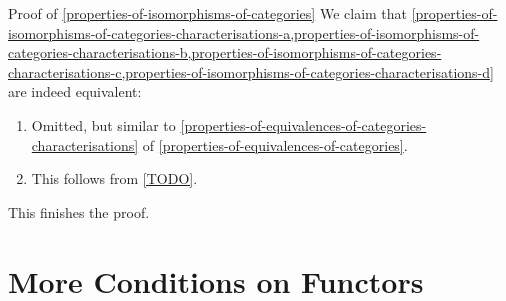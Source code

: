 \begin{Proof}{Proof of \cref{properties-of-isomorphisms-of-categories}}%
    We claim that \cref{properties-of-isomorphisms-of-categories-characterisations-a,properties-of-isomorphisms-of-categories-characterisations-b,properties-of-isomorphisms-of-categories-characterisations-c,properties-of-isomorphisms-of-categories-characterisations-d} are indeed equivalent:
    \begin{enumerate}
        \item{}Omitted, but similar to \cref{properties-of-equivalences-of-categories-characterisations} of \cref{properties-of-equivalences-of-categories}.
        \item{}This follows from \cref{TODO}.%
    \end{enumerate}
    This finishes the proof.
\end{Proof}
\section{More Conditions on Functors}\label{section-more-conditions-on-functors}
